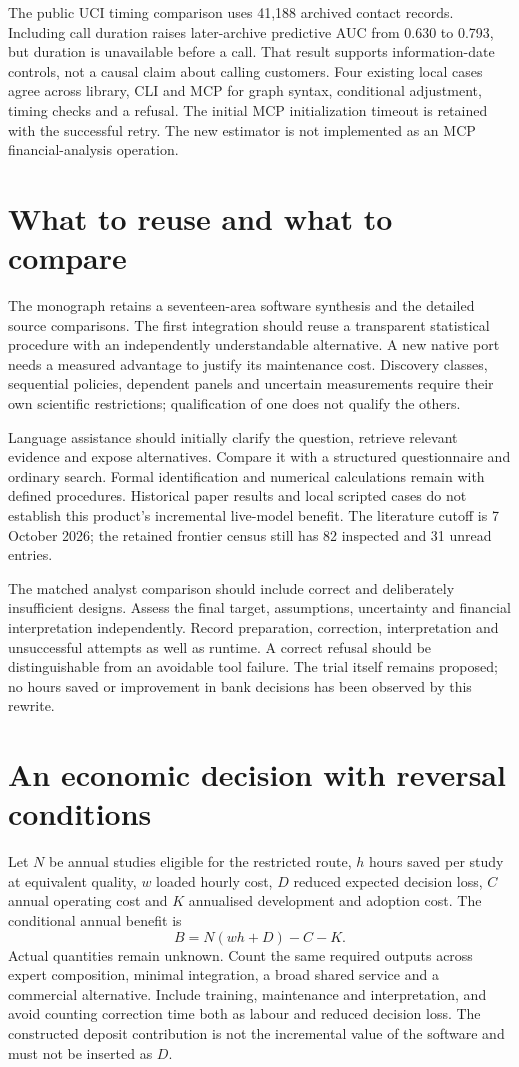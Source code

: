 The public UCI timing comparison uses 41,188 archived contact records.
Including call duration raises later-archive predictive AUC from 0.630 to
0.793, but duration is unavailable before a call. That result supports
information-date controls, not a causal claim about calling customers.
Four existing local cases agree across library, CLI and MCP for graph
syntax, conditional adjustment, timing checks and a refusal. The initial
MCP initialization timeout is retained with the successful retry. The
new estimator is not implemented as an MCP financial-analysis operation.

\section*{What to reuse and what to compare}
The monograph retains a seventeen-area software synthesis and the detailed
source comparisons. The first integration should reuse a transparent
statistical procedure with an independently understandable alternative.
A new native port needs a measured advantage to justify its maintenance
cost. Discovery classes, sequential policies, dependent panels and uncertain
measurements require their own scientific restrictions; qualification of
one does not qualify the others.

Language assistance should initially clarify the question, retrieve relevant
evidence and expose alternatives. Compare it with a structured questionnaire
and ordinary search. Formal identification and numerical calculations remain
with defined procedures. Historical paper results and local scripted cases
do not establish this product's incremental live-model benefit. The
literature cutoff is 7 October 2026; the retained frontier census still has
82 inspected and 31 unread entries.

The matched analyst comparison should include correct and deliberately
insufficient designs. Assess the final target, assumptions, uncertainty and
financial interpretation independently. Record preparation, correction,
interpretation and unsuccessful attempts as well as runtime. A correct
refusal should be distinguishable from an avoidable tool failure. The trial
itself remains proposed; no hours saved or improvement in bank decisions
has been observed by this rewrite.

\section*{An economic decision with reversal conditions}
Let $N$ be annual studies eligible for the restricted route, $h$ hours saved
per study at equivalent quality, $w$ loaded hourly cost, $D$ reduced expected
decision loss, $C$ annual operating cost and $K$ annualised development and
adoption cost. The conditional annual benefit is
\[ B=N(wh+D)-C-K. \]
Actual quantities remain unknown. Count the same required outputs across
expert composition, minimal integration, a broad shared service and a
commercial alternative. Include training, maintenance and interpretation,
and avoid counting correction time both as labour and reduced decision loss.
The constructed deposit contribution is not the incremental value of the
software and must not be inserted as $D$.

